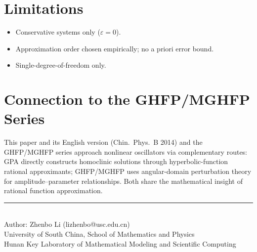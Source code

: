 \documentclass[11pt,a4paper]{article}
\begin{document}
\section{Limitations}

\begin{itemize}[leftmargin=2em]
\item Conservative systems only ($\varepsilon=0$).
\item Approximation order chosen empirically; no a priori error bound.
\item Single-degree-of-freedom only.
\end{itemize}

\section{Connection to the GHFP/MGHFP Series}

This paper and its English version (Chin.\ Phys.\ B 2014) and the GHFP/MGHFP series approach nonlinear oscillators via complementary routes: GPA directly constructs homoclinic solutions through hyperbolic-function rational approximants; GHFP/MGHFP uses angular-domain perturbation theory for amplitude--parameter relationships. Both share the mathematical insight of rational function approximation.

\vfill
\begin{center}
\small\rule{0.5\textwidth}{0.3pt}\\[4pt]
\small\color{primary} Author: Zhenbo Li (lizhenbo@usc.edu.cn)\\
\small University of South China, School of Mathematics and Physics\\
\small Hunan Key Laboratory of Mathematical Modeling and Scientific Computing
\end{center}
\end{document}
